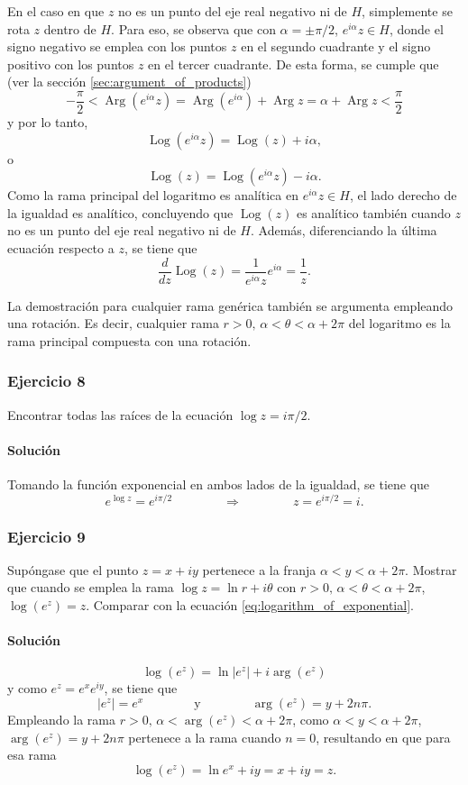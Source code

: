 \documentclass[a4paper]{report}
\DeclareMathOperator{\Arg}{Arg}
\DeclareMathOperator{\Log}{Log}
\begin{document}
En el caso en que \(z\) no es un punto del eje real negativo ni de \(H\), simplemente se rota \(z\) dentro de \(H\). Para eso, se observa que con \(\alpha=\pm\pi/2\), \(e^{i\alpha}z\in H\), donde el signo negativo se emplea con los puntos \(z\) en el segundo cuadrante y el signo positivo con los puntos \(z\) en el tercer cuadrante. De esta forma, se cumple que (ver la sección \ref{sec:argument_of_products}) 
\[
 -\frac{\pi}{2}<\Arg(e^{i\alpha}z)=\Arg(e^{i\alpha})+\Arg z=\alpha+\Arg z<\frac{\pi}{2}
\]
y por lo tanto,
\[
 \Log(e^{i\alpha}z)=\Log(z)+i\alpha,
\]
o
\[
 \Log(z)=\Log(e^{i\alpha}z)-i\alpha.
\]
Como la rama principal del logaritmo es analítica en  \(e^{i\alpha}z\in H\), el lado derecho de la igualdad es analítico, concluyendo que \(\Log(z)\) es analítico también cuando \(z\) no es un punto del eje real negativo ni de \(H\). Además, diferenciando la última ecuación respecto a \(z\), se tiene que  
\[
 \frac{d}{dz}\Log(z)=\frac{1}{e^{i\alpha}z}e^{i\alpha}=\frac{1}{z}.
\]

La demostración para cualquier rama genérica también se argumenta empleando una rotación. Es decir, cualquier rama \(r>0,\,\alpha<\theta<\alpha+2\pi\) del logaritmo es la rama principal compuesta con una rotación.

\subsubsection{Ejercicio 8}

Encontrar todas las raíces de la ecuación \(\log z=i\pi/2\).

\paragraph{Solución} Tomando la función exponencial en ambos lados de la igualdad, se tiene que 
\[
 e^{\log z}=e^{i\pi/2}
 \qquad\qquad\Rightarrow\qquad\qquad
 z=e^{i\pi/2}=i.
\]

\subsubsection{Ejercicio 9}

Supóngase que el punto \(z=x+iy\) pertenece a la franja \(\alpha<y<\alpha+2\pi\). Mostrar que cuando se emplea la rama \(\log z=\ln r+i\theta\) con \(r>0,\,\alpha<\theta<\alpha+2\pi\), \(\log(e^z)=z\). Comparar con la ecuación \ref{eq:logarithm_of_exponential}.

\paragraph{Solución}
\[
 \log(e^z)=\ln|e^z|+i\arg(e^z)
\]
y como \(e^z=e^xe^{iy}\), se tiene que
\[
 |e^z|=e^x
 \qquad\qquad\textrm{y}\qquad\qquad
 \arg(e^z)=y+2n\pi.
\]
Empleando la rama \(r>0,\,\alpha<\arg(e^z)<\alpha+2\pi\), como \(\alpha<y<\alpha+2\pi\), \(\arg(e^z)=y+2n\pi\) pertenece a la rama cuando \(n=0\), resultando en que para esa rama
\[
 \log(e^z)=\ln e^x+iy=x+iy=z.
\]
\end{document}
